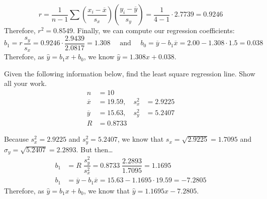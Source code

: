 \documentclass[11pt,letterpaper]{article}
\begin{document}
	\[
	r= \dfrac{1}{n - 1} \sum \left( \dfrac{x_i - \overline{x}}{s_x} \right) \left( \dfrac{y_i - \overline{y}}{s_y} \right)= \dfrac{1}{4 - 1} \cdot 2.7739= 0.9246
	\]
Therefore, $r^2= 0.8549$. Finally, we can compute our regression coefficients:
	\[
	b_1= r\, \dfrac{s_y}{s_x}= 0.9246 \cdot \dfrac{2.9439}{2.0817}= 1.308 \quad \text{ and } \quad b_0= \overline{y} - b_1 \overline{x}= 2.00 - 1.308 \cdot 1.5= 0.038
	\]
Therefore, as $\widehat{y}= b_1x + b_0$, we know $\widehat{y}= 1.308x + 0.038$. 



\newpage



 Given the following information below, find the least square regression line. Show all your work. 
	\[
	\begin{aligned}
	n&= 10 \\
	\overline{x}&= 19.59, \quad s_x^2&= 2.9225 \\
	\overline{y}&= 15.63, \quad s_y^2&= 5.2407 \\
	R&= 0.8733
	\end{aligned}
	\] \pspace

\sol Because $s_x^2= 2.9225$ and $s_y^2= 5.2407$, we know that $s_x= \sqrt{2.9225}= 1.7095$ and $\sigma_y= \sqrt{5.2407}= 2.2893$. But then\dots
	\[
	\begin{aligned}
	b_1&= R\;\dfrac{s_y^2}{s_x^2}= 0.8733\; \dfrac{2.2893}{1.7095}= 1.1695 \\[0.3cm]
	b_1&= \overline{y} - b_1 \overline{x}= 15.63 - 1.1695 \cdot 19.59= -7.2805
	\end{aligned}
	\] \pvspace{0.3cm}
Therefore, as $\widehat{y}= b_1x + b_0$, we know that $\widehat{y}= 1.1695x - 7.2805$. 



\newpage
\end{document}
